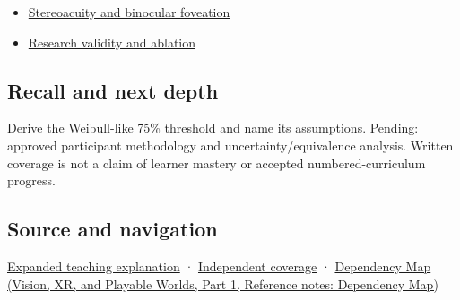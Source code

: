 \begin{itemize}
\tightlist
\item
  \hyperref[appendix-8dc848f14052]{Stereoacuity and binocular foveation}
\item
  \hyperref[appendix-65788587ef78]{Research validity and ablation}
\end{itemize}

\subsection{Recall and next depth}\label{appendix-1759f03e8ce7-recall-and-next-depth}

\hypertarget{appendix-1759f03e8ce7-recall-and-next-depth}{}

Derive the Weibull-like 75\% threshold and name its assumptions. Pending: approved participant methodology and uncertainty/equivalence analysis. Written coverage is not a claim of learner mastery or accepted numbered-curriculum progress.

\subsection{Source and navigation}\label{appendix-1759f03e8ce7-source-and-navigation}

\hypertarget{appendix-1759f03e8ce7-source-and-navigation}{}

\hyperref[04-visual-computing-ii-ch042-a-threshold-is-evidence-from-a-procedure-not-a-universal-border]{Expanded teaching explanation} · \hyperref[appendix-fd090d982a15-xr01---independent-seeing-and-representation-source]{Independent coverage} · \href{../07-Vision-XR-and-Playable-Worlds-P01/main.pdf\#nameddest=appendix-4ad47bdd269a}{Dependency Map (Vision, XR, and Playable Worlds, Part 1, Reference notes: Dependency Map)}
